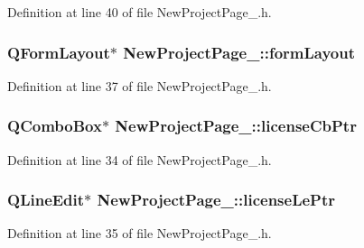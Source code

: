 Definition at line 40 of file New\-Project\-Page\-\_.\-h.

\hypertarget{class_new_project_page__3_aae75a18bd217f0736861efe3e3821a6d}{
\subsubsection[{form\-Layout}]{\setlength{\rightskip}{0pt plus 5cm}Q\-Form\-Layout$\ast$ New\-Project\-Page\-\_\-::form\-Layout\hspace{0.3cm}{\ttfamily [private]}}}\label{class_new_project_page__3_aae75a18bd217f0736861efe3e3821a6d}


Definition at line 37 of file New\-Project\-Page\-\_.\-h.

\hypertarget{class_new_project_page__3_a6459aad502f0b64eb7e16b38261bae85}{
\subsubsection[{license\-Cb\-Ptr}]{\setlength{\rightskip}{0pt plus 5cm}Q\-Combo\-Box$\ast$ New\-Project\-Page\-\_\-::license\-Cb\-Ptr\hspace{0.3cm}{\ttfamily [private]}}}\label{class_new_project_page__3_a6459aad502f0b64eb7e16b38261bae85}


Definition at line 34 of file New\-Project\-Page\-\_.\-h.

\hypertarget{class_new_project_page__3_aee5b07b36bc086e99302a67d8f3fd7b7}{
\subsubsection[{license\-Le\-Ptr}]{\setlength{\rightskip}{0pt plus 5cm}Q\-Line\-Edit$\ast$ New\-Project\-Page\-\_\-::license\-Le\-Ptr\hspace{0.3cm}{\ttfamily [private]}}}\label{class_new_project_page__3_aee5b07b36bc086e99302a67d8f3fd7b7}


Definition at line 35 of file New\-Project\-Page\-\_.\-h.

